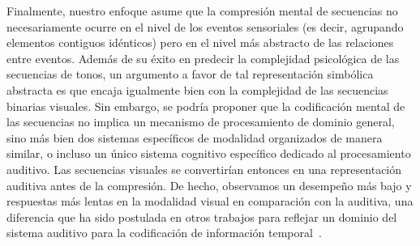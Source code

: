 
Finalmente, nuestro enfoque asume que la compresión mental de secuencias no necesariamente ocurre en el nivel de los eventos sensoriales (es decir, agrupando elementos contiguos idénticos) pero en el nivel más abstracto de las relaciones entre eventos. Además de su éxito en predecir la complejidad psicológica de las secuencias de tonos, un argumento a favor de tal representación simbólica abstracta es que encaja igualmente bien con la complejidad de las secuencias binarias visuales. Sin embargo, se podría proponer que la codificación mental de las secuencias no implica un mecanismo de procesamiento de dominio general, sino más bien dos sistemas específicos de modalidad organizados de manera similar, o incluso un único sistema cognitivo específico dedicado al procesamiento auditivo. Las secuencias visuales se convertirían entonces en una representación auditiva antes de la compresión. De hecho, observamos un desempeño más bajo y respuestas más lentas en la modalidad visual en comparación con la auditiva, una diferencia que ha sido postulada en otros trabajos para reflejar un dominio del sistema auditivo para la codificación de información temporal~\cite{f91,f118,f119}. 

